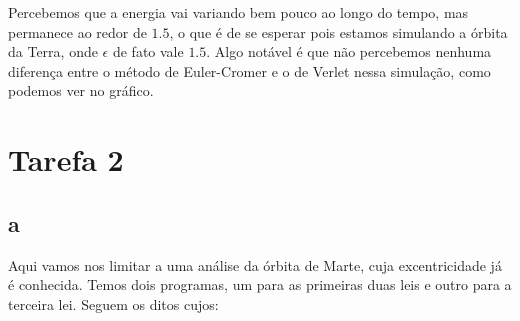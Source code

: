 \documentclass[12pt,a4paper]{article}
\begin{document}
Percebemos que a energia vai variando bem pouco ao longo do tempo, mas permanece ao redor de $1.5$, o que é de se esperar pois estamos simulando a órbita da Terra, onde $\epsilon$ de fato vale $1.5$. Algo notável é que não percebemos nenhuma diferença entre o método de Euler-Cromer e o de Verlet nessa simulação, como podemos ver no gráfico.

\section{Tarefa 2}

\subsection{a}
Aqui vamos nos limitar a uma análise da órbita de Marte, cuja excentricidade já é conhecida. Temos dois programas, um para as primeiras duas leis e outro para a terceira lei. Seguem os ditos cujos:
\end{document}
